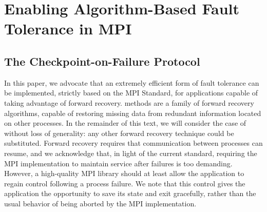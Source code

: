 \section{Enabling Algorithm-Based Fault Tolerance in MPI}
\label{sect:ompi}

\subsection{The Checkpoint-on-Failure Protocol}

In this paper, we advocate that an extremely efficient form of fault
tolerance can be implemented, strictly based on the MPI Standard, for
applications capable of taking advantage of forward recovery. \abft
methods are a family of forward recovery algorithms, capable of
restoring missing data from redundant information located on other
processes. In the remainder of this text, we will consider the case 
of \abft without loss of generality: any other forward
recovery technique could be substituted. Forward recovery requires that
communication between processes can resume, and we acknowledge that, in
light of the current standard, requiring the MPI implementation to
maintain service after failures is too demanding. However, a
high-quality MPI library should at least allow the application to regain
control following a process failure. We note that this control gives the
application the opportunity to save its state and exit gracefully,
rather than the usual behavior of being aborted by the MPI
implementation.

